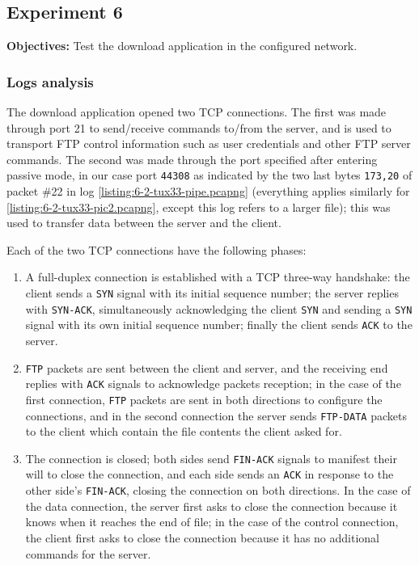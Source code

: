 \documentclass[a4paper, 11pt]{report}
\begin{document}
\subsection{Experiment 6} \label{sec:Exp6}

\textbf{Objectives:} Test the download application in the configured network.

\subsubsection{Logs analysis} \label{sec:Log6}

The download application opened two TCP connections. 
The first was made through port 21 to send/receive commands to/from the server, and is used to transport FTP control information such as user credentials and other FTP server commands.
The second was made through the port specified after entering passive mode, in our case port \texttt{44308} as indicated by the two last bytes \texttt{173,20} of packet \#22 in log \ref{listing:6-2-tux33-pipe.pcapng} (everything applies similarly for \ref{listing:6-2-tux33-pic2.pcapng}, except this log refers to a larger file); this was used to transfer data between the server and the client.

Each of the two TCP connections have the following phases:
\begin{enumerate}[leftmargin=*]
    \item A full-duplex connection is established with a TCP three-way handshake: the client sends a \texttt{SYN} signal with its initial sequence number; the server replies with \texttt{SYN-ACK}, simultaneously acknowledging the client \texttt{SYN} and sending a \texttt{SYN} signal with its own initial sequence number; finally the client sends \texttt{ACK} to the server.
    \item \texttt{FTP} packets are sent between the client and server, and the receiving end replies with \texttt{ACK} signals to acknowledge packets reception; in the case of the first connection, \texttt{FTP} packets are sent in both directions to configure the connections, and in the second connection the server sends \texttt{FTP-DATA} packets to the client which contain the file contents the client asked for.
    \item The connection is closed; both sides send \texttt{FIN-ACK} signals to manifest their will to close the connection, and each side sends an \texttt{ACK} in response to the other side's \texttt{FIN-ACK}, closing the connection on both directions. In the case of the data connection, the server first asks to close the connection because it knows when it reaches the end of file; in the case of the control connection, the client first asks to close the connection because it has no additional commands for the server.
\end{enumerate}
\end{document}
